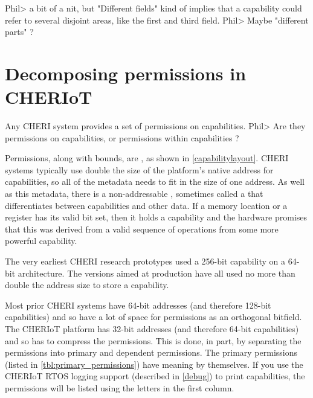 Phil> a bit of a nit, but "Different fields" kind of implies that a capability could refer to several disjoint areas, like the first and third field.
Phil> Maybe "different parts" ?   

\section[label=permissions]{Decomposing permissions in CHERIoT}


Any CHERI system provides a set of permissions on capabilities.
Phil> Are they permissions on capabilities, or permissions within capabilities ?

Permissions, along with bounds, are , as shown in \ref{capabilitylayout}.
CHERI systems typically use double the size of the platform's native address for capabilities, so all of the metadata needs to fit in the size of one address.
As well as this metadata, there is a non-addressable , sometimes called a  that differentiates between capabilities and other data.
If a memory location or a register has its valid bit set, then it holds a capability and the hardware promises that this was derived from a valid sequence of operations from some more powerful capability.


\begin{note}
The very earliest CHERI research prototypes used a 256-bit capability on a 64-bit architecture.
The versions aimed at production have all used no more than double the address size to store a capability.
\end{note}

Most prior CHERI systems have 64-bit addresses (and therefore 128-bit capabilities) and so have a lot of space for permissions as an orthogonal bitfield.
The CHERIoT platform has 32-bit addresses (and therefore 64-bit capabilities) and so has to compress the permissions.
This is done, in part, by separating the permissions into primary and dependent permissions.
The primary permissions (listed in \ref{tbl:primary_permissions}) have meaning by themselves.
If you use the CHERIoT RTOS logging support (described in \ref{debug}) to print capabilities, the permissions will be listed using the letters in the first column.

